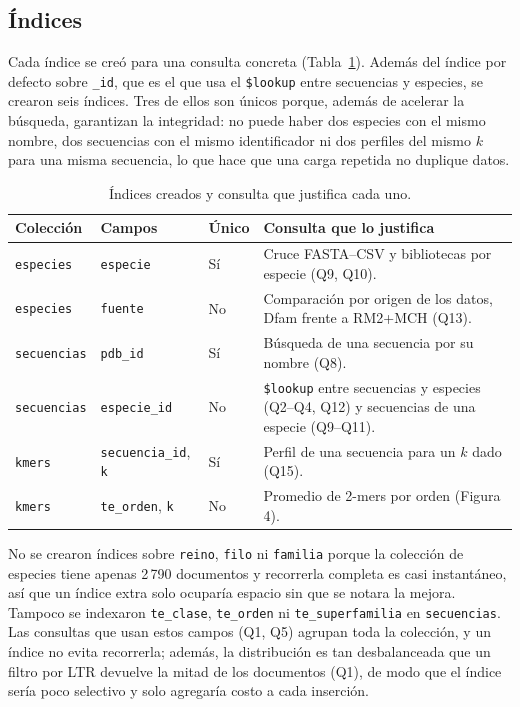 \subsection*{Índices}

Cada índice se creó para una consulta concreta (Tabla~\ref{tab:indices}).
Además del índice por defecto sobre \texttt{\_id}, que es el que usa el
\texttt{\$lookup} entre secuencias y especies, se crearon seis índices.
Tres de ellos son únicos porque, además de acelerar la búsqueda,
garantizan la integridad: no puede haber dos especies con el mismo
nombre, dos secuencias con el mismo identificador ni dos perfiles del
mismo $k$ para una misma secuencia, lo que hace que una carga repetida no
duplique datos.

\begin{table}[htbp]
\centering
\caption{Índices creados y consulta que justifica cada uno.}
\label{tab:indices}
\small
\setlength{\tabcolsep}{4pt}
\begin{tabular}{p{1.9cm}p{3.1cm}p{1.0cm}p{5.0cm}}
\hline
\textbf{Colección} & \textbf{Campos} & \textbf{Único} & \textbf{Consulta que lo justifica} \\
\hline
\texttt{especies} & \texttt{especie} & Sí &
Cruce FASTA--CSV y bibliotecas por especie (Q9, Q10). \\
\texttt{especies} & \texttt{fuente} & No &
Comparación por origen de los datos, Dfam frente a RM2+MCH (Q13). \\
\texttt{secuencias} & \texttt{pdb\_id} & Sí &
Búsqueda de una secuencia por su nombre (Q8). \\
\texttt{secuencias} & \texttt{especie\_id} & No &
\texttt{\$lookup} entre secuencias y especies (Q2--Q4, Q12) y
secuencias de una especie (Q9--Q11). \\
\texttt{kmers} & \texttt{secuencia\_id}, \texttt{k} & Sí &
Perfil de una secuencia para un $k$ dado (Q15). \\
\texttt{kmers} & \texttt{te\_orden}, \texttt{k} & No &
Promedio de 2-mers por orden (Figura 4). \\
\hline
\end{tabular}
\end{table}

No se crearon índices sobre \texttt{reino}, \texttt{filo} ni
\texttt{familia} porque la colección de especies tiene apenas 2\,790
documentos y recorrerla completa es casi instantáneo, así que un índice
extra solo ocuparía espacio sin que se notara la mejora. Tampoco se
indexaron \texttt{te\_clase}, \texttt{te\_orden} ni
\texttt{te\_superfamilia} en \texttt{secuencias}. Las consultas que usan
estos campos (Q1, Q5) agrupan toda la colección, y un índice no evita
recorrerla; además, la distribución es tan desbalanceada que un filtro
por LTR devuelve la mitad de los documentos (Q1), de modo que el índice
sería poco selectivo y solo agregaría costo a cada inserción.

